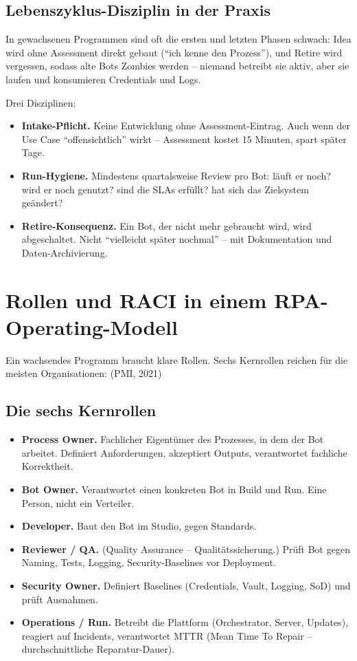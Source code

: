 \documentclass[11pt,a4paper,oneside]{article}
\newcommand{\fachbegriff}[1]{\textbf{#1}}
\newcommand{\quelle}[1]{{\footnotesize\color{lpGray}(#1)}}
\begin{document}
\subsection{Lebenszyklus-Disziplin in der Praxis}

In gewachsenen Programmen sind oft die ersten und letzten Phasen schwach: Idea wird ohne Assessment direkt gebaut (``ich kenne den Prozess''), und Retire wird vergessen, sodass alte Bots Zombies werden -- niemand betreibt sie aktiv, aber sie laufen und konsumieren Credentials und Logs.

Drei Disziplinen:

\begin{itemize}
  \item \textbf{Intake-Pflicht.} Keine Entwicklung ohne Assessment-Eintrag. Auch wenn der Use Case ``offensichtlich'' wirkt -- Assessment kostet 15 Minuten, spart später Tage.
  \item \textbf{Run-Hygiene.} Mindestens quartalsweise Review pro Bot: läuft er noch? wird er noch genutzt? sind die SLAs erfüllt? hat sich das Zielsystem geändert?
  \item \textbf{Retire-Konsequenz.} Ein Bot, der nicht mehr gebraucht wird, wird abgeschaltet. Nicht ``vielleicht später nochmal'' -- mit Dokumentation und Daten-Archivierung.
\end{itemize}

\section{Rollen und RACI in einem RPA-Operating-Modell}

Ein wachsendes Programm braucht klare Rollen. Sechs Kernrollen reichen für die meisten Organisationen: \quelle{PMI, 2021}

\subsection{Die sechs Kernrollen}

\begin{itemize}
  \item \fachbegriff{Process Owner.} Fachlicher Eigentümer des Prozesses, in dem der Bot arbeitet. Definiert Anforderungen, akzeptiert Outputs, verantwortet fachliche Korrektheit.
  \item \fachbegriff{Bot Owner.} Verantwortet einen konkreten Bot in Build und Run. Eine Person, nicht ein Verteiler.
  \item \fachbegriff{Developer.} Baut den Bot im Studio, gegen Standards.
  \item \fachbegriff{Reviewer / QA.} (Quality Assurance -- Qualit\"atssicherung.) Prüft Bot gegen Naming, Tests, Logging, Security-Baselines vor Deployment.
  \item \fachbegriff{Security Owner.} Definiert Baselines (Credentials, Vault, Logging, SoD) und prüft Ausnahmen.
  \item \fachbegriff{Operations / Run.} Betreibt die Plattform (Orchestrator, Server, Updates), reagiert auf Incidents, verantwortet MTTR (Mean Time To Repair -- durchschnittliche Reparatur-Dauer).
\end{itemize}
\end{document}
